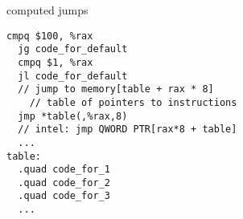 \begin{frame}[fragile,label=computeJump]{computed jumps}
\begin{lstlisting}[language=myasm]
  cmpq $100, %rax
  jg code_for_default
  cmpq $1, %rax
  jl code_for_default
  // jump to memory[table + rax * 8]
    // table of pointers to instructions
  jmp *table(,%rax,8)
  // intel: jmp QWORD PTR[rax*8 + table]
  ...
table:
  .quad code_for_1
  .quad code_for_2
  .quad code_for_3
  ...
\end{lstlisting}
\end{frame}

